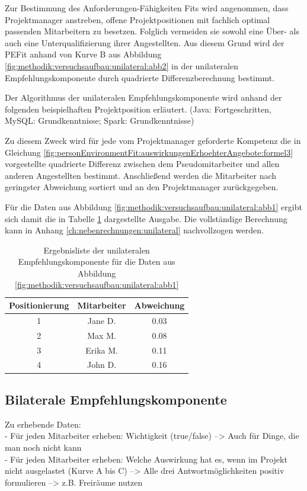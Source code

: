 Zur Bestimmung des Anforderungen-Fähigkeiten Fits wird angenommen, dass Projektmanager anstreben, offene Projektpositionen mit fachlich optimal passenden Mitarbeitern zu besetzen. Folglich vermeiden sie sowohl eine Über- als auch eine Unterqualifizierung ihrer Angestellten. Aus diesem Grund wird der \ac{PEFit} anhand von Kurve B aus Abbildung \ref{fig:methodik:versuchsaufbau:unilateral:abb2} in der unilateralen Empfehlungskomponente durch quadrierte Differenzberechnung bestimmt.

\newpage
Der Algorithmus der unilateralen Empfehlungskomponente wird anhand der folgenden beispielhaften Projektposition erläutert. (Java: Fortgeschritten, MySQL: Grundkenntnisse; Spark: Grundkenntnisse)

Zu diesem Zweck wird für jede vom Projektmanager geforderte Kompetenz die in Gleichung \ref{fig:personEnvironmentFit:auswirkungenErhoehterAngebote:formel3} vorgestellte quadrierte Differenz zwischen dem Pseudomitarbeiter und allen anderen Angestellten bestimmt. Anschließend werden die Mitarbeiter nach geringster Abweichung sortiert und an den Projektmanager zurückgegeben.

Für die Daten aus Abbildung \ref{fig:methodik:versuchsaufbau:unilateral:abb1} ergibt sich damit die in Tabelle \ref{tbl:methodik:versuchsaufbau:unilateral:tbl2} dargestellte Ausgabe. Die vollständige Berechnung kann in Anhang \ref{ch:nebenrechnungen:unilateral} nachvollzogen werden.

\begin{table}[h]
	\centering
	\begin{tabular}{c|c|c}
		Positionierung & Mitarbeiter & Abweichung\\
		\hline
		1 & Jane D.  & 0.03\\
		2 & Max M.   & 0.08\\
		3 & Erika M. & 0.11\\
		4 & John D.  & 0.16
	\end{tabular}
	\caption{Ergebnisliste der unilateralen Empfehlungskomponente für die Daten aus Abbildung \ref{fig:methodik:versuchsaufbau:unilateral:abb1}}
	\label{tbl:methodik:versuchsaufbau:unilateral:tbl2}
\end{table}

\subsection{Bilaterale Empfehlungskomponente}
\label{ch:methodik:versuchsaufbau:bilateral}

\newpage
Zu erhebende Daten:\\
- Für jeden Mitarbeiter erheben: Wichtigkeit (true/false) --> Auch für Dinge, die man noch nicht kann\\
- Für jeden Mitarbeiter erheben: Welche Auswirkung hat es, wenn im Projekt nicht ausgelastet (Kurve A bis C) --> Alle drei Antwortmöglichkeiten positiv formulieren --> z.B. Freiräume nutzen

